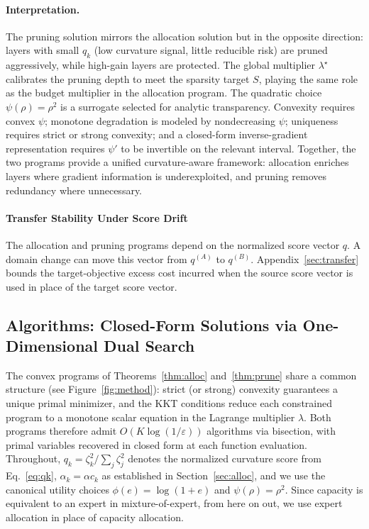 \documentclass[accepted]{uai2026}%
\theoremstyle{remark}%
\begin{document}
\paragraph{Interpretation.}
The pruning solution mirrors the allocation solution but in the opposite
direction: layers with small $q_k$ (low curvature signal, little reducible
risk) are pruned aggressively, while high-gain layers are protected.
The global multiplier $\lambda^{\star}$ calibrates the pruning depth to
meet the sparsity target $S$, playing the same role as the budget multiplier
in the allocation program.
The quadratic choice $\psi(\rho)=\rho^2$ is a surrogate
selected for analytic transparency. Convexity requires convex $\psi$;
monotone degradation is modeled by nondecreasing $\psi$; uniqueness requires
strict or strong convexity; and a closed-form inverse-gradient representation
requires $\psi'$ to be invertible on the relevant interval.
Together, the two programs provide a unified curvature-aware framework:
allocation enriches layers where gradient information is underexploited,
and pruning removes redundancy where unnecessary.
\paragraph{Transfer Stability Under Score Drift}
The allocation and pruning programs depend on the normalized score vector
$q$. A domain change can move this vector from $q^{(A)}$ to $q^{(B)}$.
Appendix~\ref{sec:transfer} bounds the target-objective excess cost incurred
when the source score vector is used in place of the target score vector.



\subsection{Algorithms: Closed-Form Solutions via One-Dimensional Dual Search}
\label{sec:algorithms}
\vspace{-2mm}

The convex programs of Theorems~\ref{thm:alloc} and~\ref{thm:prune}
share a common structure (see Figure~\ref{fig:method}): strict (or strong) convexity guarantees a unique
primal minimizer, and the KKT conditions reduce each constrained program
to a monotone scalar equation in the Lagrange multiplier $\lambda$.
Both programs therefore admit $O(K\log(1/\varepsilon))$ algorithms
via bisection, with primal variables recovered in closed form at each
function evaluation.
Throughout, $q_k = \zeta_k^2 / \sum_j \zeta_j^2$ denotes the normalized
curvature score from Eq.~\eqref{eq:qk}, $\alpha_k = \alpha c_k$ as
established in Section~\ref{sec:alloc}, and we use the canonical utility
choices $\phi(e) = \log(1+e)$ and $\psi(\rho) = \rho^2$. Since capacity is equivalent to an expert in mixture-of-expert, from here on out, we use expert allocation in place of capacity allocation.
\end{document}
